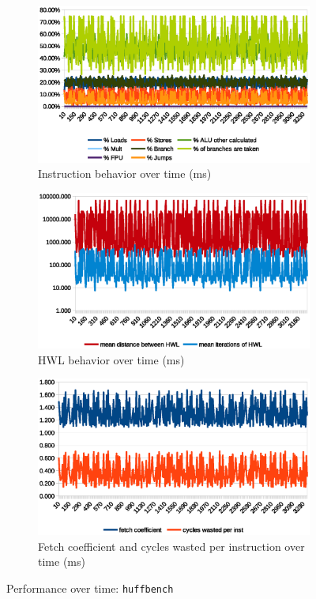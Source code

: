 \documentclass[../bachelor_paper.tex]{subfiles}
\begin{document}
\begin{figure}
    \begin{subfigure}{0.45\textwidth}
        \includegraphics[width=\textwidth]{img/graph/embench/huffbench_inst.eps}
        \caption{Instruction behavior over time (ms)}
    \end{subfigure}
    \begin{subfigure}{0.45\textwidth}
        \includegraphics[width=\textwidth]{img/graph/embench/huffbench_hwl.eps}
        \caption{\ac{HWL} behavior over time (ms)}
    \end{subfigure}
    \begin{subfigure}{0.45\textwidth}
        \includegraphics[width=\textwidth]{img/graph/embench/huffbench_fetch_waste.eps}
        \caption{Fetch coefficient and cycles wasted per instruction over time (ms)}
    \end{subfigure}
    \caption{Performance over time: \texttt{huffbench}}
\end{figure}
\end{document}
